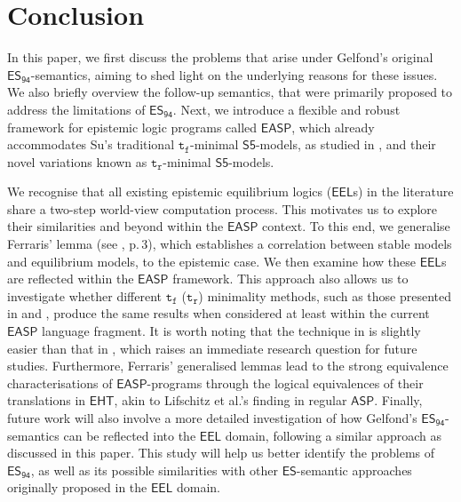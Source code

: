 \documentclass[submission,copyright,creativecommons]{eptcs}
\newcommand{\logic}[1]  { \ensuremath{\mathsf{#1}} }
\newcommand{\sfive}  { \logic{S5} }
\newcommand{\EHT}  { \logic{EHT} }
\newcommand{\ASP}  { \logic{ASP} }
\newcommand{\ES}  { \logic{ES} }
\newcommand{\EASP}  { \logic{EASP} }
\newcommand{\EEL}  { \logic{EEL} }
\newcommand{\ESdoksandort}  { \logic{ES_{\scriptscriptstyle{94}} } }
\newcommand{\functional}  { \texttt{f} }
\newcommand{\relational}  { \texttt{r} }
\newcommand{\tfunctional}  { \texttt{t}_{\!\functional} }
\newcommand{\trelational}  { \texttt{t}_{\!\relational} }
\begin{document}
\section{Conclusion}
\label{sec:conclusion}
In this paper, we first discuss the problems that arise under Gelfond's original $\ESdoksandort$-semantics, aiming to
shed light on the underlying reasons for these issues. 
We also briefly overview the follow-up semantics, that were 
primarily proposed to address the limitations of $\ESdoksandort$. 
Next, we introduce a flexible and robust 
framework for epistemic logic programs called $\EASP$, which 
already accommodates Su's traditional $\tfunctional$-minimal $\sfive$-models, 
as studied in \cite{Su19jelia}, and 
their novel variations known as $\trelational$-minimal $\sfive$-models. 

We recognise that all existing epistemic equilibrium logics ($\EEL$s) in the literature 
share a two-step world-view computation process. This motivates us to explore their similarities and beyond
within the $\EASP$ context. To this end,
we generalise Ferraris' lemma (see \cite{Ferraris05a}, p.\,3), which establishes
a correlation between stable models and equilibrium models, to the epistemic case.
We then examine how these $\EEL$s are reflected within the $\EASP$ framework. 
%
This approach also allows us to investigate whether 
different $\tfunctional$ ($\trelational$) minimality methods, such as
those presented in \cite{Su19jelia} and \cite{SuAI20}, produce the same results 
when considered at least within 
the current $\EASP$ language fragment. It is worth noting that the technique in
\cite{Su19jelia} is 
slightly easier than that in \cite{SuAI20}, which
raises an immediate research question for future studies. Furthermore,
Ferraris' generalised lemmas lead to the strong equivalence 
characterisations of
$\EASP$-programs through the logical equivalences of their translations in $\EHT$, 
akin to Lifschitz et al.'s finding \cite{ASP-strong.equivalence} 
in regular $\ASP$. 
%
Finally, future work will also involve a more detailed investigation of how
Gelfond's $\ESdoksandort$-semantics can be reflected into the $\EEL$ domain,
following a similar approach as discussed in this paper. This study will help us better identify
the problems of $\ESdoksandort$, as well as its 
possible similarities with other $\ES$-semantic approaches originally proposed
in the $\EEL$ domain.



\end{document}
